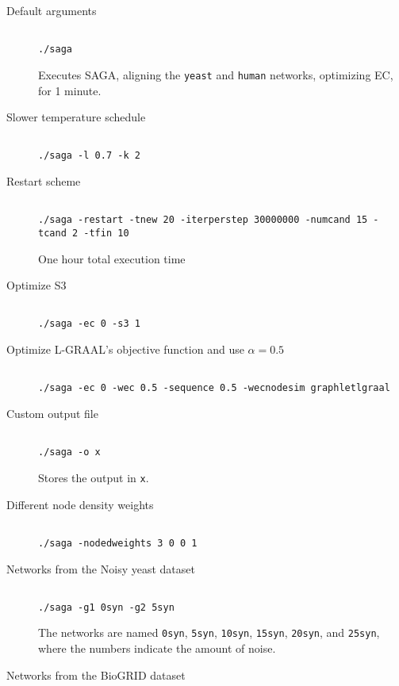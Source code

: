 \documentclass[]{article}
\begin{document}
\begin{description}
\item[Default arguments]
\begin{verbatim}

./saga
\end{verbatim}
Executes SAGA, aligning the \texttt{yeast} and \texttt{human} networks, optimizing EC, for 1 minute.
\item[Slower temperature schedule]
\begin{verbatim}

./saga -l 0.7 -k 2
\end{verbatim}
\item[Restart scheme]
\begin{verbatim}

./saga -restart -tnew 20 -iterperstep 30000000 -numcand 15 -tcand 2 -tfin 10
\end{verbatim}
One hour total execution time
\item[Optimize S3]
\begin{verbatim}

./saga -ec 0 -s3 1
\end{verbatim}
\item[Optimize L-GRAAL's objective function and use $\alpha=0.5$]
\begin{verbatim}

./saga -ec 0 -wec 0.5 -sequence 0.5 -wecnodesim graphletlgraal
\end{verbatim}
\item[Custom output file]
\begin{verbatim}

./saga -o x
\end{verbatim}
Stores the output in \texttt{x}.
\item[Different node density weights]
\begin{verbatim}

./saga -nodedweights 3 0 0 1
\end{verbatim}
\item[Networks from the Noisy yeast dataset]
\begin{verbatim}

./saga -g1 0syn -g2 5syn
\end{verbatim}
The networks are named \texttt{0syn}, \texttt{5syn}, \texttt{10syn}, \texttt{15syn}, \texttt{20syn}, and \texttt{25syn}, where the numbers indicate the amount of noise.
\item[Networks from the BioGRID dataset]
\begin{verbatim}


\end{verbatim}
\end{description}
\end{document}
